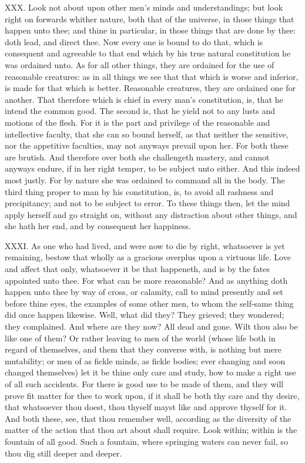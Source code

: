 XXX. Look not about upon other men's minds and understandings; but look
right on forwards whither nature, both that of the universe, in those
things that happen unto thee; and thine in particular, in those things
that are done by thee: doth lead, and direct thee. Now every one is bound
to do that, which is consequent and agreeable to that end which by his
true natural constitution he was ordained unto. As for all other things,
they are ordained for the use of reasonable creatures: as in all things we
see that that which is worse and inferior, is made for that which is
better. Reasonable creatures, they are ordained one for another. That
therefore which is chief in every man's constitution, is, that he intend
the common good. The second is, that he yield not to any lusts and motions
of the flesh. For it is the part and privilege of the reasonable and
intellective faculty, that she can so bound herself, as that neither the
sensitive, nor the appetitive faculties, may not anyways prevail upon her.
For both these are brutish. And therefore over both she challengeth
mastery, and cannot anyways endure, if in her right temper, to be subject
unto either. And this indeed most justly. For by nature she was ordained
to command all in the body. The third thing proper to man by his
constitution, is, to avoid all rashness and precipitancy; and not to be
subject to error. To these things then, let the mind apply herself and go
straight on, without any distraction about other things, and she hath her
end, and by consequent her happiness.

XXXI. As one who had lived, and were now to die by right, whatsoever is
yet remaining, bestow that wholly as a gracious overplus upon a virtuous
life. Love and affect that only, whatsoever it be that happeneth, and is
by the fates appointed unto thee. For what can be more reasonable? And as
anything doth happen unto thee by way of cross, or calamity, call to mind
presently and set before thine eyes, the examples of some other men, to
whom the self-same thing did once happen likewise. Well, what did they?
They grieved; they wondered; they complained. And where are they now? All
dead and gone. Wilt thou also be like one of them? Or rather leaving to
men of the world (whose life both in regard of themselves, and them that
they converse with, is nothing but mere mutability; or men of as fickle
minds, as fickle bodies; ever changing and soon changed themselves) let it
be thine only care and study, how to make a right use of all such
accidents. For there is good use to be made of them, and they will prove
fit matter for thee to work upon, if it shall be both thy care and thy
desire, that whatsoever thou doest, thou thyself mayst like and approve
thyself for it. And both these, see, that thou remember well, according as
the diversity of the matter of the action that thou art about shall
require. Look within; within is the fountain of all good. Such a fountain,
where springing waters can never fail, so thou dig still deeper and
deeper.

